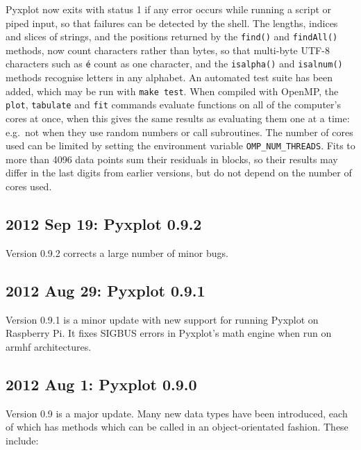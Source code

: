 \noindent Pyxplot now exits with status 1 if any error occurs while running a script or piped input, so that failures can be detected by the shell. The lengths, indices and slices of strings, and the positions returned by the {\tt find()} and {\tt findAll()} methods, now count characters rather than bytes, so that multi-byte UTF-8 characters such as {\tt \'e} count as one character, and the {\tt isalpha()} and {\tt isalnum()} methods recognise letters in any alphabet. An automated test suite has been added, which may be run with {\tt make test}. When compiled with OpenMP, the {\tt plot}, {\tt tabulate} and {\tt fit} commands evaluate functions on all of the computer's cores at once, when this gives the same results as evaluating them one at a time: e.g.\ not when they use random numbers or call subroutines. The number of cores used can be limited by setting the environment variable {\tt OMP\_NUM\_THREADS}. Fits to more than 4096 data points sum their residuals in blocks, so their results may differ in the last digits from earlier versions, but do not depend on the number of cores used.

\subsection*{2012 Sep 19: Pyxplot 0.9.2}

Version 0.9.2 corrects a large number of minor bugs.

\subsection*{2012 Aug 29: Pyxplot 0.9.1}

Version 0.9.1 is a minor update with new support for running Pyxplot on Raspberry Pi. It fixes SIGBUS errors in Pyxplot's math engine when run on armhf architectures.

\subsection*{2012 Aug 1: Pyxplot 0.9.0}

Version 0.9 is a major update. Many new data types have been introduced, each
of which has methods which can be called in an object-orientated fashion. These
include:

